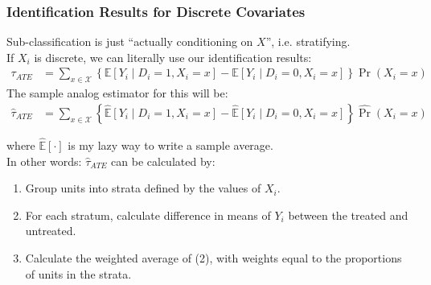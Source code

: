 \documentclass[xcolor=dvipsnames]{beamer}
\renewcommand\r{\right}
\renewcommand\l{\left}
\newcommand\E{\mathbb{E}}
\begin{document}
\begin{frame}
\frametitle{Identification Results for Discrete Covariates}
\small
Sub-classification is just ``actually conditioning on $X$'', i.e. stratifying.\\
\medskip
\small
{} If $X_i$ is \alert{discrete}, we can literally use our identification results:
\footnotesize
\begin{align*}
\tau_{ATE} &= \sum_{x \in \mathcal{X}} \l\{\E[Y_i\mid D_i=1, X_i=x] - \E[Y_i\mid D_i=0, X_i=x]\r\} \Pr(X_i = x)
\end{align*}
 The sample analog estimator for this will be:
\begin{align*}
\hat{\tau}_{ATE} &= \sum_{x \in \mathcal{X}} \l\{\hat{\E}[Y_i\mid D_i=1, X_i=x] - \hat{\E}[Y_i\mid D_i=0, X_i=x]\r\} \hat{\Pr}(X_i = x)
\end{align*}

\noindent where $\hat{\E}[\cdot]$ is my lazy way to write a sample average. \\
\smallskip
{} In other words: $\hat{\tau}_{ATE}$ can be calculated by:
\footnotesize	
	\smallskip
	\begin{enumerate}
	\addtolength{\itemsep}{.25\baselineskip}
	\item[(1)] Group units into strata defined by the values of $X_i$.
	\item[(2)] For each stratum, calculate difference in means of $Y_i$ between the treated and untreated.
	\item[(3)] Calculate the weighted average of (2), with weights equal to the proportions of units in the strata. 
	\end{enumerate}
\end{frame}
\end{document}
